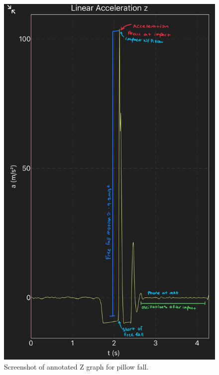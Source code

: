 \documentclass[idxtotoc,hyperref,openany]{labbook} %
\begin{document}
\begin{figure}[H] %
\begin{center}
\includegraphics[width=.80\linewidth]{images/Lab.04/Lab04Z.jpg}
\end{center}
\caption{Screenshot of annotated Z graph for pillow fall.}
\label{fig:Lab04-AnnotatedZGraph}
\end{figure}


\end{document}
